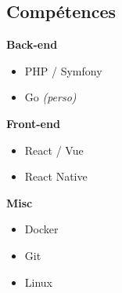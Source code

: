 \subsection*{\textcolor{maincolor}{} Compétences}
\small

\hspace{4pt}\textbf{\color{maincolor}Back-end}
\begin{itemize}[leftmargin=11pt, itemsep=1pt, label={}]
    \item PHP / Symfony
    \item Go \textit{\scriptsize(perso)}
\end{itemize}

\vspace{2pt}
\hspace{4pt}\textbf{\color{maincolor}Front-end}
\begin{itemize}[leftmargin=11pt, itemsep=1pt, label={}]
    \item React / Vue
    \item React Native
\end{itemize}

\vspace{2pt}
\hspace{4pt}\textbf{\color{maincolor}Misc}
\begin{itemize}[leftmargin=11pt, itemsep=1pt, label={}]
    \item Docker
    \item Git
    \item Linux
\end{itemize}
